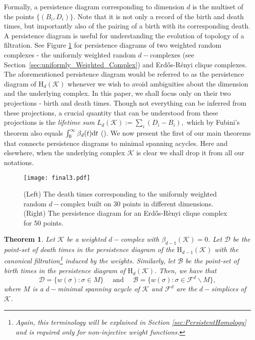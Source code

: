 \documentclass[12pt]{amsart}
\newcommand{\dy}[1]{\textcolor{magenta}{#1}}
\newcommand{\gt}[1]{\textcolor{blue}{#1}}
\renewcommand{\dy}[1]{#1}
\renewcommand{\gt}[1]{#1}
\newtheorem{theorem}{Theorem}[section]
\numberwithin{equation}{section}
\numberwithin{theorem}{section}
\newcommand{\Hg}{\mathrm{H}}
\newcommand{\1}{\mathbf{1}}
\newcommand{\df}[1]{ \textnormal{d}#1}
\def\F{\mathcal{F}}
\def\K{\mathcal{K}}
\begin{document}
\gt{Formally, a persistence diagram corresponding to dimension $d$ is the multiset of the points $\{(B_i,D_i)\}.$ Note that it is not only a record of the birth and death times, but importantly also of the pairing of a birth with its corresponding death. A persistence diagram is useful for understanding} the evolution of topology of a filtration. See Figure \ref{fig:lm_example} for persistence diagrams of two weighted random complexes - the uniformly weighted random $d-$complexes (see Section~\ref{sec:uniformly_Weighted_Complex}) and Erd\H{o}s-R\'enyi clique complexes. The aforementioned persistence diagram would be referred to as the persistence diagram of $\Hg_d(\K)$ whenever we wish to avoid ambiguities about the dimension and the underlying complex. In this paper, we shall focus only on their two projections - birth and death times. Though not everything can be inferred from these projections, a crucial quantity that can be understood from these projections is the {\em lifetime sum} $L_d(\K) := \sum_i (D_i - B_i),$ \gt{which by Fubini's theorem also equals $\int_{0}^\infty \beta_d(t) \df{t}$ (\cite[(1.4)]{hiraoka2015minimum}).} We now  present the \dy{first of our main theorems that connects persistence diagrams} to minimal spanning acycles. Here and elsewhere, when the underlying complex $\K$ is clear we shall drop it from all our notations.
%
%	
\begin{figure}[th!]
\centering
\texttt{[image: final3.pdf]}
\caption{(Left) The death times corresponding to the uniformly weighted random $d-$complex built on 30 points in different dimensions. (Right) The persistence diagram for an Erd\H{o}s-R\`enyi clique complex for 50 points. }
\label{fig:lm_example}
\end{figure}
%
\begin{theorem}
\label{thm:death_MSA}
Let $\K$ be a weighted $d-$complex with $\beta_{d-1}(\K) = 0$. Let $\mathcal{D}$ be the point-set of death times in the persistence diagram of the $\Hg_{d-1}(\K)$ with the canonical filtration\footnote{Again, this terminology will be explained in Section \ref{sec:PersistentHomology} and is required only for non-injective weight functions.} induced by the weights. Similarly, let $\mathcal{B}$ be the point-set of birth times in the persistence diagram of $\Hg_{d}(\K).$ Then, we have that
%
\[ \mathcal{D} = \{w(\sigma) : \sigma \in M \} \quad \text{ and } \quad \mathcal{B} = \{w(\sigma) : \sigma \in \F^{d} \backslash M \},\]
%
where $M$ is a $d-$minimal spanning acycle of $\K$ and $\F^{d}$ are the $d-$simplices of $\K$.
\end{theorem}
\end{document}
